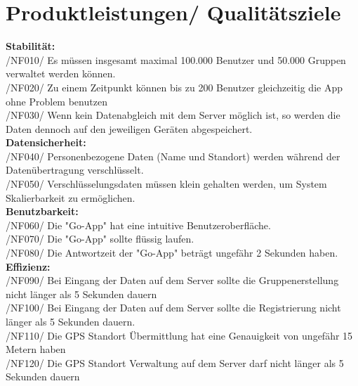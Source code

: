 \section{Produktleistungen/ Qualitätsziele}
\textbf{Stabilität:}\\
/NF010/	Es müssen insgesamt maximal 100.000 Benutzer und 50.000 Gruppen verwaltet werden können. \\
/NF020/	Zu einem Zeitpunkt können bis zu 200 Benutzer gleichzeitig die App ohne Problem benutzen \\
/NF030/	Wenn kein Datenabgleich mit dem Server möglich ist, so werden die Daten dennoch auf den jeweiligen Geräten abgespeichert.	  \\
\textbf{Datensicherheit:}\\
/NF040/	Personenbezogene Daten (Name und Standort) werden während der Datenübertragung verschlüsselt.\\
/NF050/	Verschlüsselungsdaten müssen klein gehalten werden, um System Skalierbarkeit zu ermöglichen.\\
\textbf{Benutzbarkeit:}\\
/NF060/	Die "Go-App" hat eine intuitive Benutzeroberfläche.\\
/NF070/	Die "Go-App" sollte flüssig laufen.\\
/NF080/	Die Antwortzeit der "Go-App" beträgt ungefähr 2 Sekunden haben.\\

\textbf{Effizienz:}\\
/NF090/	Bei Eingang der Daten auf dem Server sollte die Gruppenerstellung nicht länger als 5 Sekunden dauern\\
/NF100/	Bei Eingang der Daten auf dem Server sollte die Registrierung nicht länger als 5 Sekunden dauern.\\
/NF110/	Die GPS Standort Übermittlung hat eine Genauigkeit von ungefähr 15 Metern haben\\
/NF120/	Die GPS Standort Verwaltung auf dem Server darf nicht länger als 5 Sekunden dauern  \\


